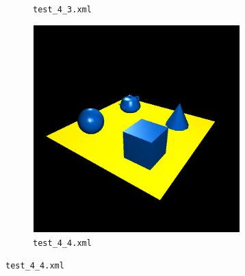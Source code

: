\documentclass[11pt,a4paper]{report}
\begin{document}
\begin{figure}[H]
\begin{subfigure}{0.5\textwidth}
  \caption{\texttt{test\_4\_3.xml}}
  \label{fig:test_4_3}
\end{subfigure}%
\begin{subfigure}{0.5\textwidth}
  \centering
  \includegraphics[width = 8cm,height = 8cm]{test_4_4.png}
  \caption{\texttt{test\_4\_4.xml}}
  \label{fig:test_4_4}
\end{subfigure}
\end{figure}
\newpage
\end{document}
